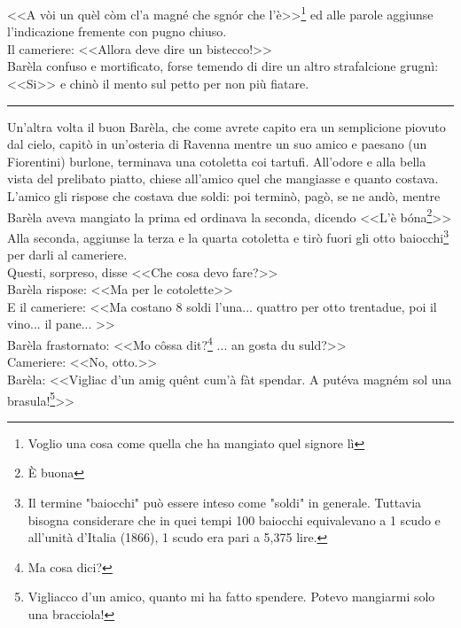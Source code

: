 \indent <<A vòi un quèl còm cl'a magné che sgnór che l'è>>\footnote{Voglio una cosa come quella che ha mangiato quel signore lì} ed alle parole aggiunse l'indicazione fremente con pugno chiuso.\\
\indent Il cameriere: <<Allora deve dire un bistecco!>>\\
Barèla confuso e mortificato, forse temendo di dire un altro strafalcione grugnì: <<Si>> e chinò il mento sul petto per non più fiatare.
\begin{center}
\rule{1.5cm}{0.4pt}
\end{center}
Un'altra volta il buon Barèla, che come avrete capito era un semplicione piovuto dal cielo, capitò in un'osteria di Ravenna mentre un suo amico e paesano (un Fiorentini) burlone, terminava una cotoletta coi tartufi. All'odore e alla bella vista del prelibato piatto, chiese all'amico quel che mangiasse e quanto costava. L'amico gli rispose che costava due soldi: poi terminò, pagò, se ne andò, mentre Barèla aveva mangiato la prima ed ordinava la seconda, dicendo <<L'è bóna\footnote{È buona}>>\\
Alla seconda, aggiunse la terza e la quarta cotoletta e tirò fuori gli otto baiocchi\footnote{Il termine "baiocchi" può essere inteso come "soldi" in generale. Tuttavia bisogna considerare che in quei tempi 100 baiocchi equivalevano a 1 scudo e all'unità d'Italia (1866), 1 scudo era pari a 5,375 lire.} per darli al cameriere.\\
\indent Questi, sorpreso, disse <<Che cosa devo fare?>>\\
\indent {}Barèla rispose: <<Ma per le cotolette>>\\
\indent E il cameriere: <<Ma costano 8 soldi l'una... quattro per otto trentadue, poi il vino... il pane... >>\\
\indent {}Barèla frastornato: <<Mo côssa dit?\footnote{Ma cosa dici?} ... an gosta du suld?>>\\
\indent Cameriere: <<No, otto.>>\\
\indent {}Barèla: <<Vigliac d'un amig quênt cum'à fàt spendar. A putéva magném sol una brasula!\footnote{Vigliacco d'un amico, quanto mi ha fatto spendere. Potevo mangiarmi solo una bracciola!}>>






































%